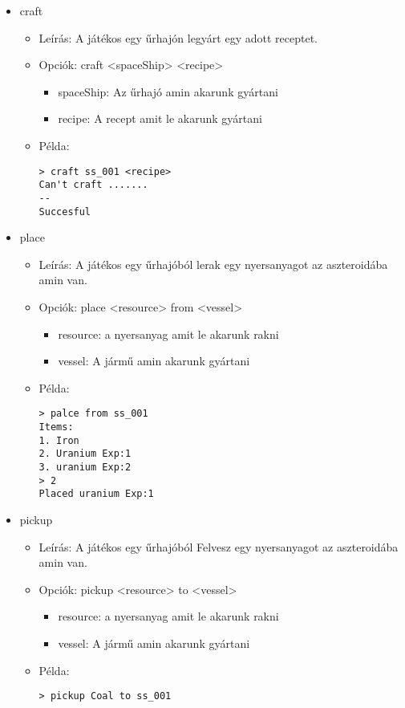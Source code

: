 \documentclass[../../projlab]{subfiles}
\begin{document}
\begin{itemize}
    \item craft
    \begin{itemize}
        \item Leírás: A játékos egy űrhajón legyárt egy adott receptet.
        \item Opciók: craft <spaceShip> <recipe>
        \begin{itemize}
            \item spaceShip: Az űrhajó amin akarunk gyártani
            \item recipe: A recept amit le akarunk gyártani
        \end{itemize}
        \item Példa:
            \begin{verbatim}
> craft ss_001 <recipe>
Can't craft .......
--
Succesful
            \end{verbatim}
    \end{itemize}


    \item place
    \begin{itemize}
        \item Leírás: A játékos egy űrhajóból lerak egy nyersanyagot az aszteroidába amin van.
        \item Opciók: place <resource> from <vessel>
        \begin{itemize}
            \item resource: a nyersanyag amit le akarunk rakni
            \item vessel: A jármű amin akarunk gyártani
        \end{itemize}
        \item Példa:
            \begin{verbatim}
> palce from ss_001
Items:
1. Iron
2. Uranium Exp:1
3. uranium Exp:2
> 2
Placed uranium Exp:1
            \end{verbatim}
    \end{itemize}

    \item pickup
    \begin{itemize}
        \item Leírás: A játékos egy űrhajóból Felvesz egy nyersanyagot az aszteroidába amin van.
        \item Opciók: pickup <resource> to <vessel>
        \begin{itemize}
            \item resource: a nyersanyag amit le akarunk rakni
            \item vessel: A jármű amin akarunk gyártani
        \end{itemize}
        \item Példa:
            \begin{verbatim}
> pickup Coal to ss_001
            \end{verbatim}
    \end{itemize}



\end{itemize}
\end{document}
